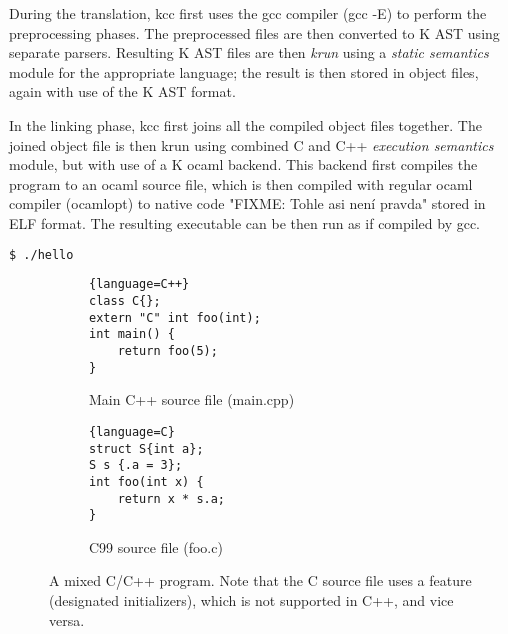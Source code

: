 \documentclass{fithesis3}
\begin{document}
During the translation, kcc first uses the gcc compiler (gcc -E) to perform the preprocessing phases. The preprocessed files are then converted to K AST using separate parsers. Resulting K AST files are then \textit{krun} using a \textit{static semantics} module for the appropriate language; the result is then stored in object files, again with use of the K AST format.

In the linking phase, kcc first joins all the compiled object files together. The joined object file is then krun using combined C and C++ \textit{execution semantics} module, but with use of a K ocaml backend. This backend first compiles the program to an ocaml source file, which is then compiled with regular ocaml compiler (ocamlopt) to native code "FIXME: Tohle asi není pravda" stored in ELF format. The resulting executable can be then run as if compiled by gcc.

\begin{lstlisting}[language=bash]
$ ./hello
\end{lstlisting}






\begin{figure}
\centering
\begin{subfigure}{.5\textwidth}
  \centering

\begin{lstlisting}{language=C++}
class C{};
extern "C" int foo(int);
int main() {
	return foo(5);
}
\end{lstlisting}

  \caption{Main C++ source file (main.cpp)}
\end{subfigure}%
\begin{subfigure}{.5\textwidth}
  \centering
\begin{lstlisting}{language=C}
struct S{int a};
S s {.a = 3};
int foo(int x) {
	return x * s.a;
}
\end{lstlisting}
  \caption{C99 source file (foo.c)}
\end{subfigure}
\caption{A mixed C/C++ program. Note that the C source file uses a feature (designated initializers), which is not supported in C++, and vice versa.}
\label{fig:cpp-program-example}
\end{figure}
\end{document}

